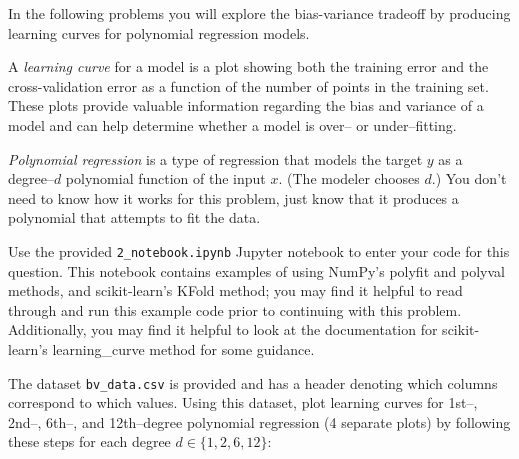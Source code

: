 In the following problems you will explore the bias-variance tradeoff by producing learning curves for polynomial regression models.

A \emph{learning curve} for a model is a plot showing both the training error and the cross-validation error as a function of the number of points in the training set. These plots provide valuable information regarding the bias and variance of a model and can help determine whether a model is over-- or under--fitting.

\emph{Polynomial regression} is a type of regression that models the target $y$ as a degree--$d$ polynomial function of the input $x$. (The modeler chooses $d$.)  You don't need to know how it works for this problem, just know that it produces a polynomial that attempts to fit the data.

\begin{problem}[14]
    Use the provided \texttt{2_notebook.ipynb} Jupyter notebook to enter your code for this question. This notebook contains examples of using NumPy's polyfit and polyval methods, and scikit-learn's KFold method; you may find it helpful to read through and run this example code prior to continuing with this problem. Additionally, you may find it helpful to look at the documentation for scikit-learn's learning_curve method for some guidance.

The dataset \texttt{bv_data.csv} is provided and has a header denoting which columns correspond to which values. Using this dataset, plot learning curves for 1st--, 2nd--, 6th--, and 12th--degree polynomial regression (4 separate plots) by following these steps for each degree $d \in \{1, 2, 6, 12\}$:


\end{problem}
